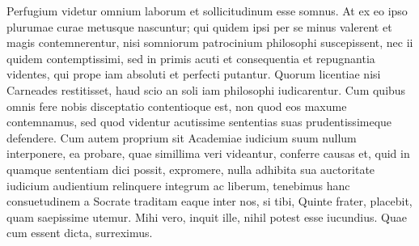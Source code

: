  Perfugium videtur omnium laborum et sollicitudinum esse somnus. At ex eo ipso plurumae curae metusque nascuntur; qui quidem ipsi per se minus valerent et magis contemnerentur, nisi somniorum patrocinium philosophi suscepissent, nec ii quidem contemptissimi, sed in primis acuti et consequentia et repugnantia videntes, qui prope iam absoluti et perfecti putantur. Quorum licentiae nisi Carneades restitisset, haud scio an soli iam philosophi iudicarentur. Cum quibus omnis fere nobis disceptatio contentioque est, non quod eos maxume contemnamus, sed quod videntur acutissime sententias suas prudentissimeque defendere. Cum autem proprium sit Academiae iudicium suum nullum interponere, ea probare, quae simillima veri videantur, conferre causas et, quid in quamque sententiam dici possit, expromere, nulla adhibita sua auctoritate iudicium audientium relinquere integrum ac liberum, tenebimus hanc consuetudinem a Socrate traditam eaque inter nos, si tibi, Quinte frater, placebit, quam saepissime utemur. Mihi vero, inquit ille, nihil potest esse iucundius. Quae cum essent dicta, surreximus.

